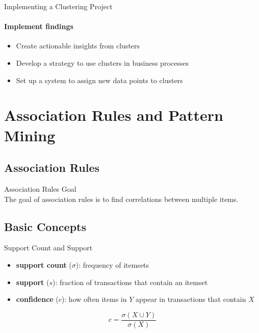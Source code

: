\begin{KR}{Implementing a Clustering Project}
\paragraph{Implement findings}
\begin{itemize}
    \item Create actionable insights from clusters
    \item Develop a strategy to use clusters in business processes
    \item Set up a system to assign new data points to clusters
\end{itemize}
\end{KR}

\section{Association Rules and Pattern Mining}

\subsection{Association Rules}

\begin{definition}{Association Rules Goal}\\
The goal of association rules is to find correlations between multiple items.
\end{definition}

\subsection{Basic Concepts}

\begin{definition}{Support Count and Support}
\begin{itemize}
    \item \textbf{support count} ($\sigma$): frequency of itemsets
    \item \textbf{support} ($s$): fraction of transactions that contain an itemset
    \item \textbf{confidence} ($c$): how often items in $Y$ appear in transactions that contain $X$
\end{itemize}

$$c = \frac{\sigma(X \cup Y)}{\sigma(X)}$$
\end{definition}

